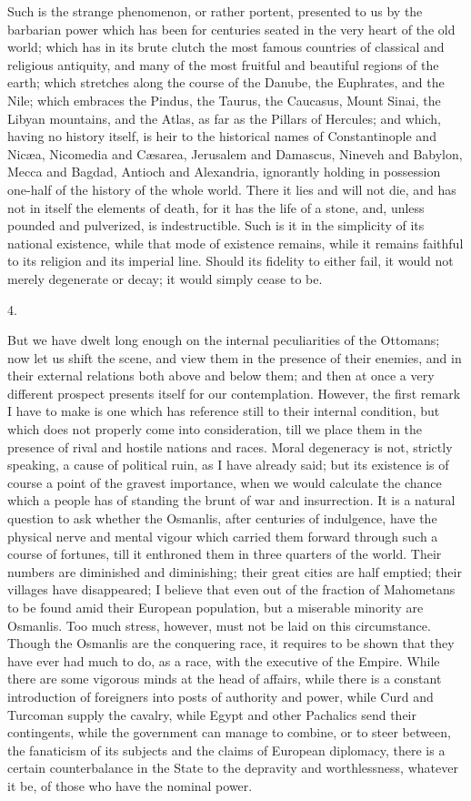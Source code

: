 Such is the strange
phenomenon, or rather portent, presented to us by the barbarian power
which has been for centuries seated in the very heart of the old
world; which has in its brute clutch the most famous countries of
classical and religious antiquity, and many of the most fruitful and
beautiful regions of the earth; which stretches along the course of
the Danube, the Euphrates, and the Nile; which embraces the Pindus,
the Taurus, the Caucasus, Mount Sinai, the Libyan mountains, and the
Atlas, as far as the Pillars of Hercules; and which, having no history
itself, is heir to the historical names of Constantinople and Nicæa,
Nicomedia and Cæsarea, Jerusalem and Damascus, Nineveh and Babylon,
Mecca and Bagdad, Antioch and Alexandria, ignorantly holding in
possession one-half of the history of the whole world. There it lies
and will not die, and has not in itself the elements of death, for it
has the life of a stone, and, unless pounded and pulverized, is
indestructible. Such is it in the simplicity of its national
existence, while that mode of existence remains, while it remains
faithful to its religion and its imperial line. Should its fidelity to
either fail, it would not merely degenerate or decay; it would simply
cease to be.

4.

But we have dwelt long enough
on the internal peculiarities of the Ottomans; now let us shift the
scene, and view them in the presence of their enemies, and in their
external relations both above and below them; and then at once a very
different prospect presents itself for our contemplation. However, the
first remark I have to make is one which has reference still to their
internal condition, but which does not properly come into
consideration, till we place them in the presence of rival and
hostile nations and races. Moral degeneracy is not, strictly speaking,
a cause of political ruin, as I have already said; but its existence
is of course a point of the gravest importance, when we would
calculate the chance which a people has of standing the brunt of war
and insurrection. It is a natural question to ask whether the Osmanlis,
after centuries of indulgence, have the physical nerve and mental
vigour which carried them forward through such a course of fortunes,
till it enthroned them in three quarters of the world. Their numbers
are diminished and diminishing; their great cities are half emptied;
their villages have disappeared; I believe that even out of the
fraction of Mahometans to be found amid their European population, but
a miserable minority are Osmanlis. Too much stress, however, must not
be laid on this circumstance. Though the Osmanlis are the conquering
race, it requires to be shown that they have ever had much to do, as a
race, with the executive of the Empire. While there are some vigorous
minds at the head of affairs, while there is a constant introduction
of foreigners into posts of authority and power, while Curd and
Turcoman supply the cavalry, while Egypt and other Pachalics send
their contingents, while the government can manage to combine, or to
steer between, the fanaticism of its subjects and the claims of
European diplomacy, there is a certain counterbalance in the State to
the depravity and worthlessness, whatever it be, of those who have the
nominal power.

